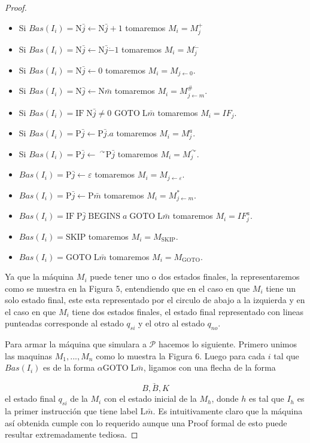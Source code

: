 \begin{proof}
		\begin{itemize}
			\item Si $Bas(I_{i})=\mathrm{N}\bar{j}\leftarrow \mathrm{N}\bar{j}+1$ tomaremos $M_{i}=M_{j}^{+}$
	    \item Si $Bas(I_{i})=\mathrm{N}\bar{j}\leftarrow \mathrm{N}\bar{j}\dot{-} 1 $ tomaremos $M_{i}=M_{j}^{\dot{-}}$
	    \item Si $Bas(I_{i})=\mathrm{N}\bar{j}\leftarrow 0$ tomaremos $ M_{i}=M_{j\leftarrow 0}$.
	    \item Si $Bas(I_{i})=\mathrm{N}\bar{j}\leftarrow \mathrm{N}\bar{m}$ tomaremos $M_{i}=M_{j\leftarrow m}^{\#}$.
	    \item Si $Bas(I_{i})=\mathrm{IF}\;\mathrm{N}\bar{j}\not=0$ $\mathrm{GOTO} \;\mathrm{L}\bar{m}$ tomaremos $M_{i}=IF_{j}.$
	    \item Si $Bas(I_{i})=\mathrm{P}\bar{j}\leftarrow \mathrm{P}\bar{j}.a$ tomaremos $M_{i}=M_{j}^{a}$.
	    \item Si $Bas(I_{i})=\mathrm{P}\bar{j}\leftarrow \ ^{\curvearrowright } \mathrm{P}\bar{j}$ tomaremos $M_{i}=M_{j}^{\curvearrowright }$.
	    \item $Bas(I_{i})=\mathrm{P}\bar{j}\leftarrow \varepsilon $ tomaremos $ M_{i}=M_{j\leftarrow \varepsilon }$.
	    \item $Bas(I_{i})=\mathrm{P}\bar{j}\leftarrow \mathrm{P}\bar{m}$ tomaremos $M_{i}=M_{j\leftarrow m}^{\ast }$.
	    \item $Bas(I_{i})=\mathrm{IF}\;\mathrm{P}\bar{j}\;\mathrm{BEGINS}\;a\; \mathrm{GOTO}\;\mathrm{L}\bar{m}$ tomaremos $M_{i}=IF_{j}^{a}$.
	    \item $Bas(I_{i})=\mathrm{SKIP}$ tomaremos $M_{i}=M_{\mathrm{SKIP}}$.
	    \item $Bas(I_{i})=\mathrm{GOTO}\;\mathrm{L}\bar{m}$ tomaremos $ M_{i}=M_{\mathrm{GOTO}}$.
		\end{itemize}

    Ya que la máquina $M_{i}$ puede tener uno o dos estados finales, la representaremos como se muestra en la Figura 5,
    entendiendo que en el caso en que $M_{i}$ tiene un solo estado final, este esta representado por el circulo de
    abajo a la izquierda y en el caso en que $M_{i}$ tiene dos estados finales, el estado final representado con lineas
     punteadas corresponde al estado $q_{si}$ y el otro al estado $q_{no}$.

    Para armar la máquina que simulara a $\mathcal{P}$ hacemos lo siguiente. Primero unimos las maquinas
    $M_{1},...,M_{n}$ como lo muestra la Figura 6. Luego para cada $i$ tal que $Bas(I_{i})$ es de la forma
    $\alpha \mathrm{GOTO} \;\mathrm{L}\bar{m}$, ligamos con una flecha de la forma

		\[
    \displaystyle \underrightarrow{\;\;\;\;\;\;B,B,K\;\;\;\;\;\;}
		\]
    el estado final $q_{si}$ de la $M_{i}$ con el estado inicial de la $M_{h}$, donde $h$ es tal que $I_{h}$ es la
    primer instrucción que tiene label $ \mathrm{L}\bar{m}$.
    Es intuitivamente claro que la máquina así obtenida cumple con lo requerido aunque una Proof formal de esto puede
    resultar extremadamente tediosa.
	\end{proof}

